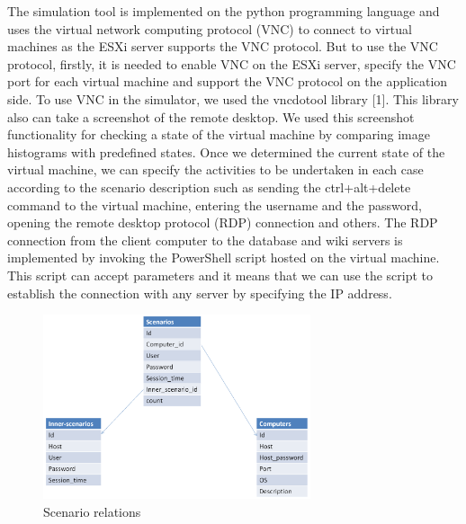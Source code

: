 The simulation tool is implemented on the python programming language and uses the virtual network computing protocol (VNC) to connect to virtual machines as the ESXi server supports the VNC protocol. But to use the VNC protocol, firstly, it is needed to enable VNC on the ESXi server, specify the VNC port for each virtual machine and support the VNC protocol on the application side. To use VNC in the simulator, we used the vncdotool library [1]. This library also can take a screenshot of the remote desktop. We used this screenshot functionality for checking a state of the virtual machine by comparing image histograms with predefined states. Once we determined the current state of the virtual machine, we can specify the activities to be undertaken in each case according to the scenario description such as sending the ctrl+alt+delete command to the virtual machine, entering the username and the password, opening the remote desktop protocol (RDP) connection and others. The RDP connection from the client computer to the database and wiki servers is implemented by invoking the PowerShell script hosted on the virtual machine. This script can accept parameters and it means that we can use the script to establish the connection with any server by specifying the IP address.

\begin{figure}[ht!]
\centering
\includegraphics[width=0.7\textwidth]{scenario_relations.png}
\caption{Scenario relations}
\label{overflow}
\end{figure}

